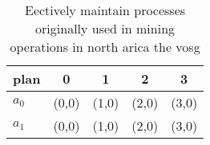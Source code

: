 \documentclass[a4paper]{article}
\begin{document}
\begin{table}
\begin{adjustbox}{width=0.5\columnwidth}
\begin{tabular}{|l|l|l|l|l|}
\hline
\textbf{plan} & \multicolumn{1}{c|}{\textbf{0}} & \multicolumn{1}{c|}{\textbf{1}} & \multicolumn{1}{c|}{\textbf{2}} & \multicolumn{1}{c|}{\textbf{3}} \\ \hline
\textbf{$a_0$}  & (0,0) & (1,0) & (2,0) & (3,0) \\ \hline
\textbf{$a_1$}  & (0,0) & (1,0) & (2,0) & (3,0) \\ \hline
\end{tabular}
\end{adjustbox}
\caption{Eectively maintain processes originally used in mining operations in north arica the vosg
}
\end{table}
\end{document}
